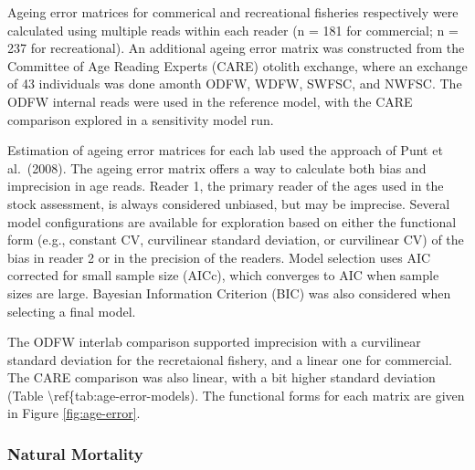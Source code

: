 \documentclass[11pt,
  english,
  a4paper,
]{article}
\begin{document}
\leavevmode\tagmcend\tagstructend\par


Ageing error matrices for commerical and recreational fisheries respectively were calculated using multiple reads within each reader (n = 181 for commercial; n = 237 for recreational). An additional ageing error matrix was constructed from the Committee of Age Reading Experts (CARE) otolith exchange, where an exchange of 43 individuals was done amonth ODFW, WDFW, SWFSC, and NWFSC. The ODFW internal reads were used in the reference model, with the CARE comparison explored in a sensitivity model run.

\leavevmode\tagmcend\tagstructend\par


Estimation of ageing error matrices for each lab used the approach of Punt et al.~(2008). The ageing error matrix offers a way to calculate both bias and imprecision in age reads. Reader 1, the primary reader of the ages used in the stock assessment, is always considered unbiased, but may be imprecise. Several model configurations are available for exploration based on either the functional form (e.g., constant CV, curvilinear standard deviation, or curvilinear CV) of the bias in reader 2 or in the precision of the readers. Model selection uses AIC corrected for small sample size (AICc), which converges to AIC when sample sizes are large. Bayesian Information Criterion (BIC) was also considered when selecting a final model.

\leavevmode\tagmcend\tagstructend\par


The ODFW interlab comparison supported imprecision with a curvilinear standard deviation for the recretaional fishery, and a linear one for commercial. The CARE comparison was also linear, with a bit higher standard deviation (Table \textbackslash ref\{tab:age-error-models). The functional forms for each matrix are given in Figure \ref{fig:age-error}.

\leavevmode\tagmcend\tagstructend\par


\hypertarget{natural-mortality}{%
\subsubsection{Natural Mortality}\label{natural-mortality}}
\end{document}
